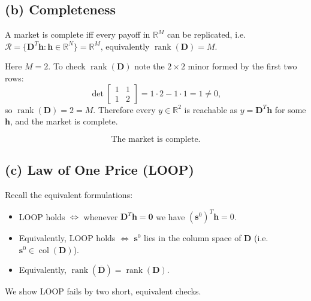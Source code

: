 \documentclass{article}
\begin{document}
\subsection*{(b) Completeness}
A market is complete iff every payoff in \(\mathbb R^M\) can be replicated, i.e.
\(\mathcal R=\{ \mathbf D^T\mathbf h:\mathbf h\in\mathbb R^N\}=\mathbb R^M\),
equivalently \(\operatorname{rank}(\mathbf D)=M\).

Here \(M=2\). To check \(\operatorname{rank}(\mathbf D)\) note the \(2\times2\) minor formed by the first two rows:
\[
\det\begin{bmatrix}1 & 1\\[2pt]1 & 2\end{bmatrix}=1\cdot2-1\cdot1=1\neq0,
\]
so \(\operatorname{rank}(\mathbf D)=2=M\). Therefore every \(y\in\mathbb R^2\) is reachable as \(y=\mathbf D^T\mathbf h\) for some \(\mathbf h\), and the market is complete.

\[
\boxed{\text{The market is complete.}}
\]

\subsection*{(c) Law of One Price (LOOP)}
Recall the equivalent formulations:
\begin{itemize}
  \item LOOP holds \(\iff\) whenever \(\mathbf D^T\mathbf h=\mathbf 0\) we have \((\mathbf s^0)^T\mathbf h=0\).
  \item Equivalently, LOOP holds \(\iff\) \(\mathbf s^0\) lies in the column space of \(\mathbf D\) (i.e.\ \(\mathbf s^0\in\operatorname{col}(\mathbf D)\)).
  \item Equivalently, \(\operatorname{rank}(\overline{\mathbf D})=\operatorname{rank}(\mathbf D)\).
\end{itemize}

We show LOOP fails by two short, equivalent checks.
\end{document}
